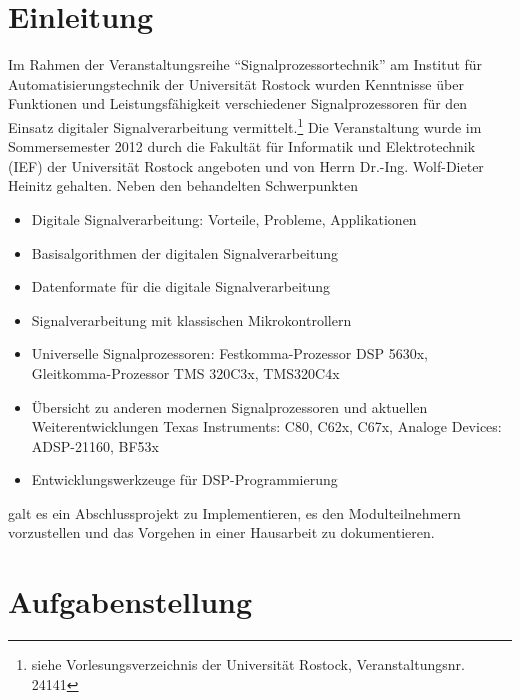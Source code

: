 \documentclass[a4paper,12pt,fontsize=12,DIV=12]{scrartcl}
\begin{document}
\tableofcontents
\thispagestyle{empty}

\clearpage

\onehalfspacing

\pagestyle{plain}


\section{Einleitung}
Im Rahmen der Veranstaltungsreihe "`Signalprozessortechnik"' am Institut für Automatisierungstechnik der Universität Rostock wurden Kenntnisse über Funktionen und Leistungsfähigkeit verschiedener Signalprozessoren für den Einsatz digitaler Signalverarbeitung vermittelt.\footnote{siehe Vorlesungsverzeichnis der Universität Rostock, Veranstaltungsnr. 24141 }
Die Veranstaltung wurde im Sommersemester 2012 durch die Fakultät für Informatik und Elektrotechnik (IEF) der Universität Rostock angeboten und von Herrn Dr.-Ing. Wolf-Dieter Heinitz gehalten.
Neben den behandelten Schwerpunkten

 \begin{itemize} 
\item Digitale Signalverarbeitung: Vorteile, Probleme, Applikationen
\item Basisalgorithmen der digitalen Signalverarbeitung
\item Datenformate für die digitale Signalverarbeitung
\item Signalverarbeitung mit klassischen Mikrokontrollern
\item Universelle Signalprozessoren: Festkomma-Prozessor DSP 5630x, Gleitkomma-Prozessor TMS 320C3x, TMS320C4x
\item Übersicht zu anderen modernen Signalprozessoren und aktuellen Weiterentwicklungen Texas Instruments: C80, C62x, C67x, Analoge Devices: ADSP-21160, BF53x
\item Entwicklungswerkzeuge für DSP-Programmierung
\end{itemize}

galt es ein Abschlussprojekt zu Implementieren, es den Modulteilnehmern vorzustellen und das Vorgehen in einer Hausarbeit zu dokumentieren.

\section{Aufgabenstellung}
\end{document}
